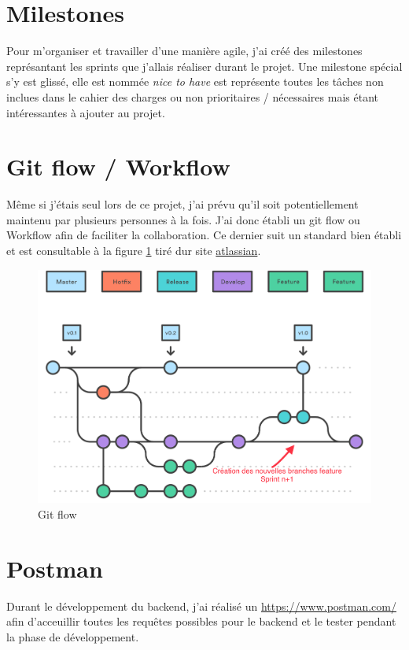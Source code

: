 \documentclass[
    iai, %
    il, %
]{heig-tb}
\begin{document}
\section{Milestones}
Pour m'organiser et travailler d'une manière agile, j'ai créé des milestones représantant les sprints que j'allais réaliser durant le projet. Une milestone spécial s'y est glissé, elle est nommée \emph{nice to have} est représente toutes les tâches non inclues dans le cahier des charges ou non prioritaires / nécessaires mais étant intéressantes à ajouter au projet.

\section{Git flow / Workflow}
Même si j'étais seul lors de ce projet, j'ai prévu qu'il soit potentiellement maintenu par plusieurs personnes à la fois. J'ai donc établi un \Gls{git} flow ou Workflow afin de faciliter la collaboration. Ce dernier suit un standard bien établi et est consultable à la figure
\ref{git-flow} tiré dur site \href{https://www.atlassian.com/fr/git/tutorials/comparing-workflows/.gitflow-workflow}{atlassian}.

\begin{center}
    \begin{figure}[h]
        \includegraphics[width=\textwidth]{./assets/figures/git-flow.png}
        \caption{Git flow \label{git-flow}}
    \end{figure}
\end{center}

\section{Postman}
Durant le développement du \Gls{backend}, j'ai réalisé un \href{Postman collaboratif}{https://www.postman.com/} afin d'acceuillir toutes les requêtes possibles pour le \Gls{backend} et le tester pendant la phase de développement.
\end{document}
